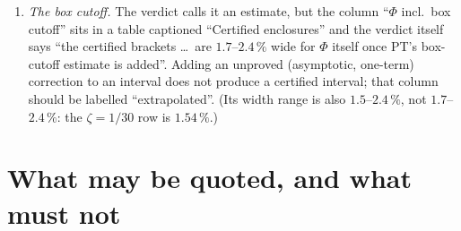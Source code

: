 \documentclass[11pt]{article}
\begin{document}
\begin{verdictgap}
\begin{enumerate}[label=(\roman*),leftmargin=1.8em]
 arithmetic'' --- not done anywhere.  (d) ``the \emph{measured} (and, in Part~II, certified) values
 of $\tau$'' --- $\tau$ is not certified in Part~II.
\item \emph{The box cutoff.}  The verdict calls it an estimate, but the column ``$\Phi$ incl.\ box
 cutoff'' sits in a table captioned ``Certified enclosures'' and the verdict itself says
 ``the certified brackets \ldots\ are $1.7$--$2.4\,\%$ wide for $\Phi$ itself once PT's box-cutoff
 estimate is added''.  Adding an unproved (asymptotic, one-term) correction to an interval does not
 produce a certified interval; that column should be labelled ``extrapolated''.  (Its width range is
 also $1.5$--$2.4\,\%$, not $1.7$--$2.4\,\%$: the $\zeta=1/30$ row is $1.54\,\%$.)
\end{enumerate}
\end{verdictgap}

\section{What may be quoted, and what must not}\label{sec:quotable}
\end{document}
